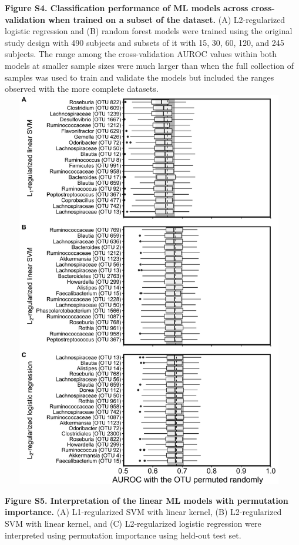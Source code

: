 \documentclass[11pt,]{article}
\begin{document}
\textbf{Figure S4. Classification performance of ML models across
cross-validation when trained on a subset of the dataset.} (A)
L2-regularized logistic regression and (B) random forest models were
trained using the original study design with 490 subjects and subsets of
it with 15, 30, 60, 120, and 245 subjects. The range among the
cross-validation AUROC values within both models at smaller sample sizes
were much larger than when the full collection of samples was used to
train and validate the models but included the ranges observed with the
more complete datasets. \newpage
\includegraphics[height=17.5cm, width=13cm]{Figure_S5.png}

\textbf{Figure S5. Interpretation of the linear ML models with
permutation importance.} (A) L1-regularized SVM with linear kernel, (B)
L2-regularized SVM with linear kernel, and (C) L2-regularized logistic
regression were interpreted using permutation importance using held-out
test set.
\end{document}
